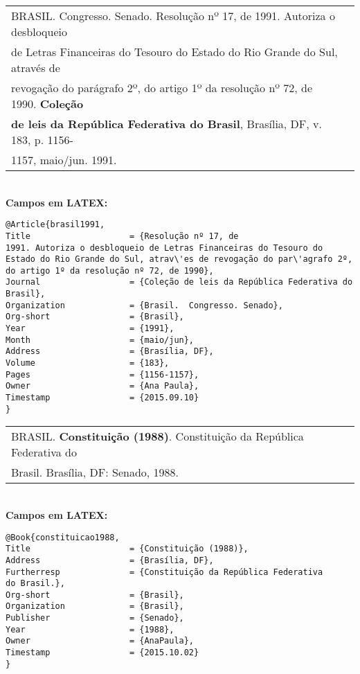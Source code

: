 \begin{tabular}{|l|c|} \hline
	BRASIL. Congresso. Senado. Resolução nº 17, de 1991. Autoriza o desbloqueio \\ de Letras Financeiras do Tesouro do Estado do Rio Grande do Sul, atrav\'es de \\ revogação do par\'agrafo 2º, do artigo 1º da resolução nº 72, de
	1990. \textbf{Coleção} \\ \textbf{de leis da República Federativa do Brasil}, Brasília, DF, v.
	183, p. 1156-\\1157, maio/jun. 1991.
	\\\hline
\end{tabular} \\

\textbf{Campos em LATEX:} 


\begin{verbatim}
@Article{brasil1991,
Title                    = {Resolução nº 17, de
1991. Autoriza o desbloqueio de Letras Financeiras do Tesouro do 
Estado do Rio Grande do Sul, atrav\'es de revogação do par\'agrafo 2º, 
do artigo 1º da resolução nº 72, de 1990},
Journal                  = {Coleção de leis da República Federativa do 
Brasil},
Organization             = {Brasil.  Congresso. Senado},
Org-short                = {Brasil},
Year                     = {1991},
Month                    = {maio/jun},
Address                  = {Brasília, DF},
Volume                   = {183},
Pages                    = {1156-1157},
Owner                    = {Ana Paula},
Timestamp                = {2015.09.10}
}
\end{verbatim}

\begin{tabular}{|l|c|} \hline
	BRASIL. \textbf{Constituição (1988)}. Constituição da República Federativa do \\Brasil. Brasília, DF: Senado, 1988. 
	\\\hline
\end{tabular} \\

\textbf{Campos em LATEX:} 

\begin{verbatim}
@Book{constituicao1988,
Title                    = {Constituição (1988)},
Address                  = {Brasília, DF},
Furtherresp              = {Constituição da República Federativa 
do Brasil.},
Org-short                = {Brasil},
Organization             = {Brasil},
Publisher                = {Senado},
Year                     = {1988},
Owner                    = {AnaPaula},
Timestamp                = {2015.10.02}
}
\end{verbatim}

